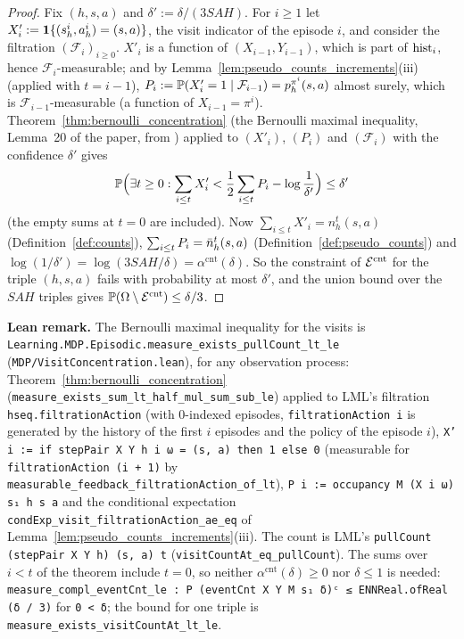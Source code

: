 \begin{proof}
\leanok
Fix $(h, s, a)$ and $\delta' := \delta/(3SAH)$. For $i \ge 1$ let $X'_i := \mathbf{1}\{(s^i_h, a^i_h) = (s, a)\}$,
the visit indicator of the episode $i$, and consider the filtration $(\mathcal F_i)_{i \ge 0}$.
$X'_i$ is a function of $(X_{i-1}, Y_{i-1})$, which is part of $\mathrm{hist}_i$, hence $\mathcal F_i$-measurable;
and by Lemma~\ref{lem:pseudo_counts_increments}(iii) (applied with $t = i - 1$),
$P_i := \mathbb{P}(X'_i = 1 \mid \mathcal F_{i-1}) = p^{\pi^i}_h(s, a)$ almost surely, which is
$\mathcal F_{i-1}$-measurable (a function of $X_{i-1} = \pi^i$). Theorem~\ref{thm:bernoulli_concentration}
(the Bernoulli maximal inequality, Lemma~20 of the paper, from \cite{dann2017unifying}) applied
to $(X'_i)$, $(P_i)$ and $(\mathcal F_i)$ with the confidence $\delta'$ gives
\[
  \mathbb{P}\Big(\exists t \ge 0 : \sum_{i \le t} X'_i < \frac12 \sum_{i \le t} P_i - \log\frac1{\delta'}\Big) \le \delta'
\]
(the empty sums at $t = 0$ are included). Now $\sum_{i \le t} X'_i = n_h^t(s, a)$
(Definition~\ref{def:counts}), $\sum_{i \le t} P_i = \bar{n}_h^t(s, a)$ (Definition~\ref{def:pseudo_counts})
and $\log(1/\delta') = \log(3SAH/\delta) = \alpha^{\mathrm{cnt}}(\delta)$. So the constraint of $\mathcal{E}^{\mathrm{cnt}}$ for
the triple $(h, s, a)$ fails with probability at most $\delta'$, and the union bound over the $SAH$
triples gives $\mathbb{P}(\Omega \setminus \mathcal{E}^{\mathrm{cnt}}) \le \delta/3$.
\end{proof}

\textbf{Lean remark.} The Bernoulli maximal inequality for the visits is
\texttt{Learning.MDP.Episodic.measure\_exists\_pullCount\_lt\_le} (\texttt{MDP/VisitConcentration.lean}),
for any observation process: Theorem~\ref{thm:bernoulli_concentration}
(\texttt{measure\_exists\_sum\_lt\_half\_mul\_sum\_sub\_le}) applied to LML's filtration
\texttt{hseq.filtrationAction} (with $0$-indexed episodes, \texttt{filtrationAction i} is generated
by the history of the first $i$ episodes and the policy of the episode $i$),
\texttt{X' i := if stepPair X Y h i ω = (s, a) then 1 else 0} (measurable for
\texttt{filtrationAction (i + 1)} by \texttt{measurable\_feedback\_filtrationAction\_of\_lt}),
\texttt{P i := occupancy M (X i ω) s₁ h s a} and the conditional expectation
\texttt{condExp\_visit\_filtrationAction\_ae\_eq} of Lemma~\ref{lem:pseudo_counts_increments}(iii).
The count is LML's \texttt{pullCount (stepPair X Y h) (s, a) t} (\texttt{visitCountAt\_eq\_pullCount}).
The sums over $i < t$ of the theorem include $t = 0$, so neither $\alpha^{\mathrm{cnt}}(\delta) \ge 0$ nor
$\delta \le 1$ is needed: \texttt{measure\_compl\_eventCnt\_le : P (eventCnt X Y M s₁ δ)ᶜ ≤ ENNReal.ofReal (δ / 3)}
for \texttt{0 < δ}; the bound for one triple is \texttt{measure\_exists\_visitCountAt\_lt\_le}.

